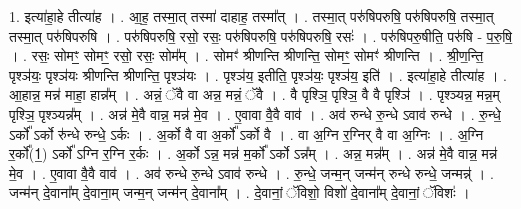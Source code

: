 \documentclass[17pt]{extarticle}
\begin{document}
1. इत्या॑हा॒हे तीत्या॑ह । . आ॒ह॒ तस्मा॒त् तस्मा॑ दाहाह॒ तस्मा᳚त् । . तस्मा॒त् परु॑षिपरुषि॒ परु॑षिपरुषि॒ तस्मा॒त् तस्मा॒त् परु॑षिपरुषि । . परु॑षिपरुषि॒ रसो॒ रसः॒ परु॑षिपरुषि॒ परु॑षिपरुषि॒ रसः॑ । . परु॑षिपरु॒षीति॒ परु॑षि - प॒रु॒षि॒ । . रसः॒ सोमꣳ॒॒ सोमꣳ॒॒ रसो॒ रसः॒ सोम᳚म् । . सोमꣳ॑ श्रीणन्ति श्रीणन्ति॒ सोमꣳ॒॒ सोमꣳ॑ श्रीणन्ति । . श्री॒ण॒न्ति॒ पृश्ञ॑यः॒ पृश्ञ॑यः श्रीणन्ति श्रीणन्ति॒ पृश्ञ॑यः । . पृश्ञ॑य॒ इतीति॒ पृश्ञ॑यः॒ पृश्ञ॑य॒ इति॑ । . इत्या॑हा॒हे तीत्या॑ह । . आ॒हान्न॒ मन्न॑ माहा॒ हान्न᳚म् । . अन्नं॒ ॅवै वा अन्न॒ मन्नं॒ ॅवै । . वै पृश्ञि॒ पृश्ञि॒ वै वै पृश्ञि॑ । . पृश्ञ्यन्न॒ मन्न॒म् पृश्ञि॒ पृश्ञ्यन्न᳚म् । . अन्न॑ मे॒वै वान्न॒ मन्न॑ मे॒व । . ए॒वावा वै॒वै वाव॑ । . अव॑ रुन्धे रु॒न्धे ऽवाव॑ रुन्धे । . रु॒न्धे॒ ऽर्को᳚ ऽर्को रु॑न्धे रुन्धे॒ ऽर्कः । . अ॒र्को वै वा अ॒र्को᳚ ऽर्को वै । . वा अ॒ग्नि र॒ग्निर् वै वा अ॒ग्निः । . अ॒ग्नि र॒र्को᳚(1॒) ऽर्को᳚ ऽग्नि र॒ग्नि र॒र्कः । . अ॒र्को ऽन्न॒ मन्न॑ म॒र्को᳚ ऽर्को ऽन्न᳚म् । . अन्न॒ मन्न᳚म् । . अन्न॑ मे॒वै वान्न॒ मन्न॑ मे॒व । . ए॒वावा वै॒वै वाव॑ । . अव॑ रुन्धे रु॒न्धे ऽवाव॑ रुन्धे । . रु॒न्धे॒ जन्म॒न् जन्म॑न् रुन्धे रुन्धे॒ जन्मन्न्॑ । . जन्म॑न् दे॒वाना᳚म् दे॒वाना॒म् जन्म॒न् जन्म॑न् दे॒वाना᳚म् । . दे॒वानां॒ ॅविशो॒ विशो॑ दे॒वाना᳚म् दे॒वानां॒ ॅविशः॑ । \newline
\end{document}
